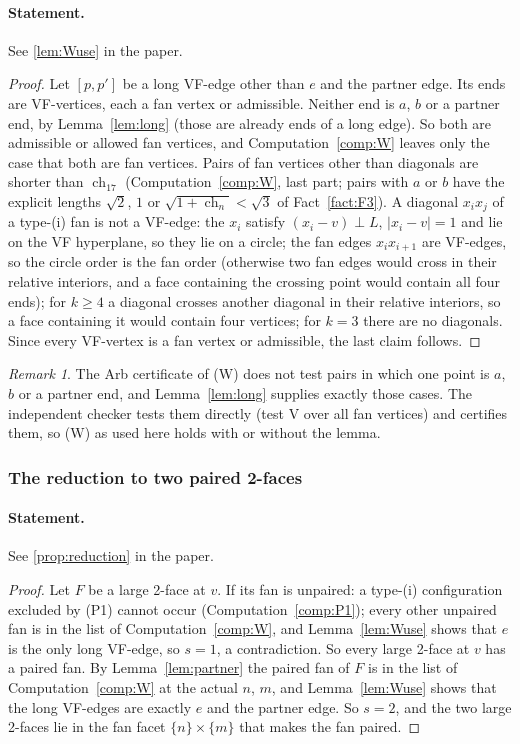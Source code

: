 \documentclass[11pt]{article}
\theoremstyle{definition}
\theoremstyle{remark}
\newtheorem{remark}[theorem]{Remark}
\newcommand{\ch}{\operatorname{ch}}
\begin{document}
\paragraph{Statement.} See \ref{lem:Wuse} in the paper.

\begin{proof}
Let $[p,p']$ be a long VF-edge other than $e$ and the partner edge. Its ends
are VF-vertices, each a fan vertex or admissible. Neither end is $a$, $b$ or
a partner end, by Lemma~\ref{lem:long} (those are already ends of a long
edge). So both are admissible or allowed fan vertices, and
Computation~\ref{comp:W} leaves only the case that both are fan vertices.
Pairs of fan vertices other than diagonals are shorter than $\ch_{17}$
(Computation~\ref{comp:W}, last part; pairs with $a$ or $b$ have the
explicit lengths $\sqrt2$, $1$ or $\sqrt{1+\ch_n}<\sqrt3$ of
Fact~\ref{fact:F3}). A diagonal $x_ix_j$ of a type-(i) fan is not a
VF-edge: the $x_i$ satisfy $(x_i-v)\perp L$, $|x_i-v|=1$ and lie on the VF
hyperplane, so they lie on a circle; the fan edges $x_ix_{i+1}$ are
VF-edges, so the circle order is the fan order (otherwise two fan edges
would cross in their relative interiors, and a face containing the
crossing point would contain all four ends); for $k\ge4$ a diagonal crosses
another diagonal in their relative interiors, so a face containing it would
contain four vertices; for $k=3$ there are no diagonals. Since every
VF-vertex is a fan vertex or admissible, the last claim follows.
\end{proof}

\setcounter{theorem}{14}
\begin{remark}
The Arb certificate of (W) does not test pairs in which one
point is $a$, $b$ or a partner end, and Lemma~\ref{lem:long} supplies
exactly those cases. The independent checker tests them directly
(test V over all fan vertices) and certifies them, so (W) as used here
holds with or without the lemma.
\end{remark}


\subsubsection{The reduction to two paired 2-faces}

\paragraph{Statement.} See \ref{prop:reduction} in the paper.

\begin{proof}
Let $F$ be a large 2-face at $v$. If its fan is unpaired: a type-(i)
configuration excluded by (P1) cannot occur (Computation~\ref{comp:P1});
every other unpaired fan is in the list of Computation~\ref{comp:W}, and
Lemma~\ref{lem:Wuse} shows that $e$ is the only long VF-edge, so $s=1$, a
contradiction. So every large 2-face at $v$ has a paired fan. By
Lemma~\ref{lem:partner} the paired fan of $F$ is in the list of
Computation~\ref{comp:W} at the actual $n$, $m$, and Lemma~\ref{lem:Wuse}
shows that the long VF-edges are exactly $e$ and the partner edge. So
$s=2$, and the two large 2-faces lie in the fan facet $\{n\}\times\{m\}$
that makes the fan paired.
\end{proof}
\end{document}
